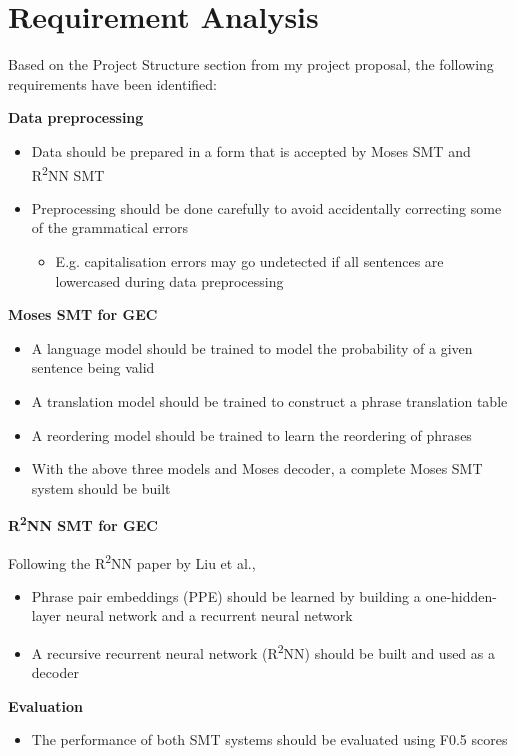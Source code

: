 \documentclass[12pt,a4paper,twoside,openright]{report}
\begin{document}
\section{Requirement Analysis}

Based on the Project Structure section from my project proposal, the following requirements have been identified:

\textbf{Data preprocessing}
\begin{itemize}
    \item Data should be prepared in a form that is accepted by Moses SMT and R\textsuperscript{2}NN SMT
    \item Preprocessing should be done carefully to avoid accidentally correcting some of the grammatical errors 
    
    \begin{itemize}
        \item E.g. capitalisation errors may go undetected if all sentences are lowercased during data preprocessing
    \end{itemize}
\end{itemize}

\textbf{Moses SMT for GEC}
\begin{itemize}
    \item A language model should be trained to model the probability of a given sentence being valid
    \item A translation model should be trained to construct a phrase translation table
    \item A reordering model should be trained to learn the reordering of phrases
    \item With the above three models and Moses decoder, a complete Moses SMT system should be built
\end{itemize}

\textbf{R\textsuperscript{2}NN SMT for GEC}

Following the R\textsuperscript{2}NN paper by Liu et al.\cite{r2nn},
\begin{itemize}
    \item Phrase pair embeddings (PPE) should be learned by building a one-hidden-layer neural network and a recurrent neural network
    \item A recursive recurrent neural network (R\textsuperscript{2}NN) should be built and used as a decoder
\end{itemize}

\textbf{Evaluation}
\begin{itemize}
    \item The performance of both SMT systems should be evaluated using F0.5 scores
\end{itemize}
\end{document}
